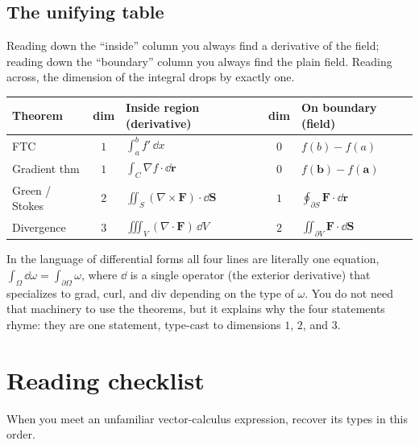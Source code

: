 \documentclass{essay}
\newcommand{\F}{\mathbf{F}}
\begin{document}
\subsection{The unifying table}

Reading down the ``inside'' column you always find a derivative of the field; reading
down the ``boundary'' column you always find the plain field. Reading across, the
dimension of the integral drops by exactly one.

\begin{center}
  \renewcommand{\arraystretch}{1.5}
  \begin{tabular}{@{}l c l c l@{}}
    \toprule
    \textbf{Theorem} & \textbf{dim} & \textbf{Inside region (derivative)} & \textbf{dim} & \textbf{On boundary (field)} \\
    \midrule
    FTC               & $1$ & $\displaystyle\int_a^b f'\,\dd x$ & $0$ & $f(b)-f(a)$ \\
    Gradient thm      & $1$ & $\displaystyle\int_C \nabla f\cdot\dd\mathbf{r}$ & $0$ & $f(\mathbf{b})-f(\mathbf{a})$ \\
    Green / Stokes    & $2$ & $\displaystyle\iint_S (\nabla\times\F)\cdot\dd\mathbf{S}$ & $1$ & $\displaystyle\oint_{\partial S}\F\cdot\dd\mathbf{r}$ \\
    Divergence        & $3$ & $\displaystyle\iiint_V (\nabla\cdot\F)\,\dd V$ & $2$ & $\displaystyle\iint_{\partial V}\F\cdot\dd\mathbf{S}$ \\
    \bottomrule
  \end{tabular}
\end{center}

In the language of differential forms all four lines are literally one equation,
$\int_{\Omega} \dd\omega = \int_{\partial\Omega}\omega$, where $\dd$ is a single
operator (the exterior derivative) that specializes to grad, curl, and div depending
on the type of $\omega$. You do not need that machinery to use the theorems, but it
explains why the four statements rhyme: they are one statement, type-cast to
dimensions $1$, $2$, and $3$.

\section{Reading checklist}

When you meet an unfamiliar vector-calculus expression, recover its types in this
order.
\end{document}
